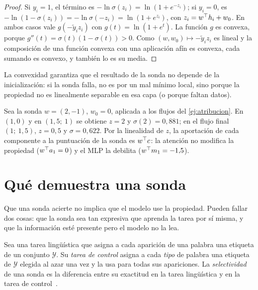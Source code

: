 \begin{proof}
Si $y_i=1$, el término es $-\ln\sigma(z_i)=\ln(1+e^{-z_i})$; si $y_i=0$, es $-\ln(1-\sigma(z_i))=-\ln\sigma(-z_i)=\ln(1+e^{z_i})$, con $z_i=w^{\top} h_i+w_0$. En ambos casos vale $g(-\tilde y_iz_i)$ con $g(t)=\ln(1+e^{t})$. La función $g$ es convexa, porque $g''(t)=\sigma(t)(1-\sigma(t))>0$. Como $(w,w_0)\mapsto-\tilde y_iz_i$ es lineal y la composición de una función convexa con una aplicación afín es convexa, cada sumando es convexo, y también lo es su media.
\end{proof}

La convexidad garantiza que el resultado de la sonda no depende de la inicialización: si la sonda falla, no es por un mal mínimo local, sino porque la propiedad no es linealmente separable en esa capa (o porque faltan datos).

\begin{ejemplo}\label{ej:sonda}
Sea la sonda $w=(2,-1)$, $w_0=0$, aplicada a los flujos del \cref{ej:atribucion}. En $(1,0)$ y en $(1{,}5;\allowbreak\ 1)$ se obtiene $z=2$ y $\sigma(2)=0{,}881$; en el flujo final $(1;\allowbreak\ 1{,}5)$, $z=0{,}5$ y $\sigma=0{,}622$. Por la linealidad de $z$, la aportación de cada componente a la puntuación de la sonda es $w^{\top} c$: la atención no modifica la propiedad ($w^{\top} a_1=0$) y el MLP la debilita ($w^{\top} m_1=-1{,}5$).
\end{ejemplo}

\section{Qué demuestra una sonda}
\label{sec:2-control}

Que una sonda acierte no implica que el modelo use la propiedad. Pueden fallar dos cosas: que la sonda sea tan expresiva que aprenda la tarea por sí misma, y que la información esté presente pero el modelo no la lea.

\begin{definicion}\label{def:control}
Sea una tarea lingüística que asigna a cada aparición de una palabra una etiqueta de un conjunto $\mathcal{Y}$. Su \emph{tarea de control} asigna a cada \emph{tipo} de palabra una etiqueta de $\mathcal{Y}$ elegida al azar una vez y la usa para todas sus apariciones. La \emph{selectividad} de una sonda es la diferencia entre su exactitud en la tarea lingüística y en la tarea de control~\cite[§2]{hewitt-liang}.
\end{definicion}

